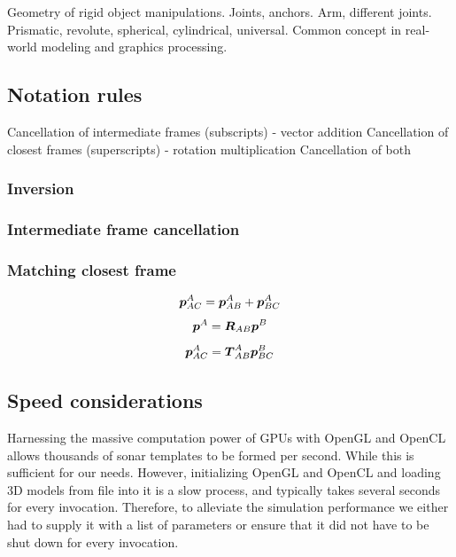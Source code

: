 Geometry of rigid object manipulations. Joints, anchors. Arm, different joints. Prismatic, revolute, spherical, cylindrical, universal. Common concept in real-world modeling and graphics processing.




\subsection{Notation rules}

Cancellation of intermediate frames (subscripts)   - vector addition
Cancellation of closest frames      (superscripts) - rotation multiplication
Cancellation of both

\subsubsection{Inversion}


\subsubsection{Intermediate frame cancellation}



\subsubsection{Matching closest frame}

$$\boldsymbol{p}_{AC}^A = \boldsymbol{p}_{AB}^A + \boldsymbol{p}_{BC}^A$$
$$\boldsymbol{p}^A = \boldsymbol{R}_{AB} \boldsymbol{p}^B$$
$$\boldsymbol{p}_{AC}^A = \boldsymbol{T}_{AB}^A \boldsymbol{p}_{BC}^B$$


\subsection{Speed considerations}

Harnessing the massive computation power of GPUs with OpenGL and OpenCL allows thousands of sonar templates to be formed per second. While this is sufficient for our needs. However, initializing OpenGL and OpenCL and loading 3D models from file into it is a slow process, and typically takes several seconds for every invocation. Therefore, to alleviate the simulation performance we either had to supply it with a list of parameters or ensure that it did not have to be shut down for every invocation. 

